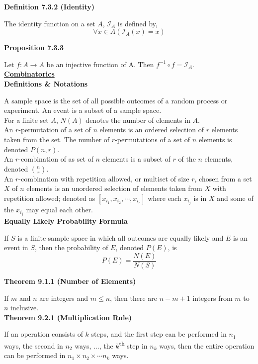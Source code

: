 \documentclass[a4paper]{article}
\newcommand{\heading}[1]{{\small\underline{\textbf{#1}}}}
\newcommand{\subheading}[1]{{\scriptsize\textbf{#1}}}
\begin{document}
\begin{multicols*}{4}
\subheading{Definition 7.3.2 (Identity)}

The identity function on a set $A$, $\mathcal{I}_A$ is defined by,
$$\forall x \in A(\mathcal{I}_A(x) = x)$$

\subheading{Proposition 7.3.3}

Let $f : A \rightarrow A$ be an injective function of A. Then $f^{-1} \circ f =
\mathcal{I}_A$.\\

\heading{Combinatorics}\\

\subheading{Definitions \& Notations}

A sample space is the set of all possible outcomes of a random process or
experiment. An event is a subset of a sample space.\\

For a finite set $A$, $N(A)$ denotes the number of elements in $A$.\\

An $r$-permutation of a set of $n$ elements is an ordered selection of $r$
elements taken from the set. The number of $r$-permutations of a set of $n$
elements is denoted $P(n, r)$.\\

An $r$-combination of as set of $n$ elements is a subset of $r$ of the $n$
elements, denoted $\binom{n}{r}$.\\

An $r$-combination with repetition allowed, or multiset of size $r$, chosen from
a set $X$ of $n$ elements is an unordered selection of elements taken from $X$
with repetition allowed; denoted as $[x_{i_1}, x_{i_2}, \cdots, x_{i_r}]$ where
each $x_{i_j}$ is in $X$ and some of the $x_{i_j}$ may equal each other.\\

\subheading{Equally Likely Probability Formula}

If $S$ is a finite sample space in which all outcomes are equally likely and $E$
is an event in $S$, then the probability of $E$, denoted $P(E)$, is
$$P(E) = \frac{N(E)}{N(S)}$$

\subheading{Theorem 9.1.1 (Number of Elements)}

If $m$ and $n$ are integers and $m \leq n$, then there are $n-m+1$ integers from
$m$ to $n$ inclusive.\\

\subheading{Theorem 9.2.1 (Multiplication Rule)}

If an operation consists of $k$ steps, and the first step can be performed in
$n_1$ ways, the second in $n_2$ ways, ..., the $k$\textsuperscript{th} step
in $n_k$ ways, then the entire operation can be performed in $n_1 \times n_2
\times \cdots n_k$ ways.\\


\end{multicols*}
\end{document}
